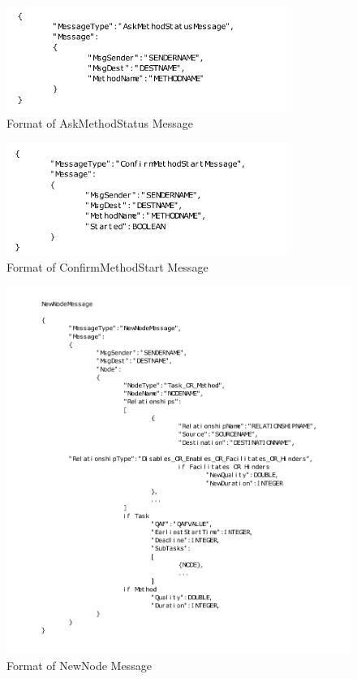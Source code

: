 \begin{enumerate}
\begin{figure}[H]
\centering
\includegraphics[width=3.6in]{figs/AskMethodStatus.pdf}
\caption{Format of AskMethodStatus Message}
\label{fig:AskMethodStatus}
\end{figure}

\begin{figure}[H]
\centering
\includegraphics[width=3.6in]{figs/ConfirmMethodStart.pdf}
\caption{Format of ConfirmMethodStart Message}
\label{fig:ConfirmMethodStart}
\end{figure}

\begin{figure}[H]
\centering
\includegraphics[width=5in]{figs/NewNodeMessage.pdf}
\caption{Format of NewNode Message}
\label{fig:NewNodeMessage}
\end{figure}


\end{enumerate}
